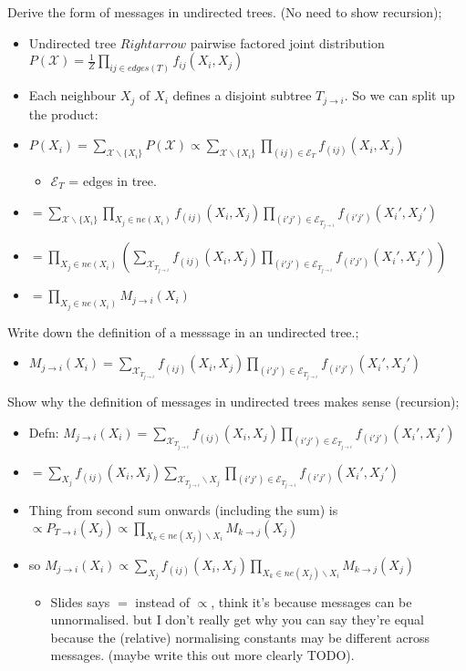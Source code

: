 \documentclass{article}
\begin{document}
Derive the form of messages in undirected trees. (No need to show recursion); \begin{itemize}
    \item Undirected tree $Rightarrow$ pairwise factored joint distribution $P(\mathcal{X})= \frac{1}{Z}\prod_{ij \in edges(T)}f_{ij}(X_i, X_j)$
    \item Each neighbour $X_j$ of $X_i$ defines a disjoint subtree $T_{j\rightarrow i}$. So we can split up the product:
    \item $P(X_i) = \sum_{\mathcal{X}\backslash\{X_i\}} P(\mathcal{X}) \propto \sum_{\mathcal{X}\backslash\{X_i\}}\prod_{(ij)\in \mathcal{E}_T} f_{(ij)}(X_i, X_j)$
    \begin{itemize}
        \item $\mathcal{E}_T$ = edges in tree.
    \end{itemize}
    \item $= \sum_{\mathcal{X}\backslash\{X_i\}}\prod_{X_j\in ne(X_i)}f_{(ij)}(X_i, X_j)\prod_{(i'j')\in \mathcal{E}_T_{j\rightarrow i}} f_{(i'j')}(X_i', X_j')$
    \item $= \prod_{X_j\in ne(X_i)}(\sum_{\mathcal{X}_{T_{j\rightarrow i}}}f_{(ij)}(X_i, X_j)\prod_{(i'j')\in \mathcal{E}_T_{j\rightarrow i}} f_{(i'j')}(X_i', X_j'))$
    \item $= \prod_{X_j\in ne(X_i)}M_{j\rightarrow i}(X_i)$
\end{itemize}

Write down the definition of a messsage in an undirected tree.; \begin{itemize}
    \item  $M_{j\rightarrow i}(X_i) =\sum_{\mathcal{X}_{T_{j\rightarrow i}}}f_{(ij)}(X_i, X_j)\prod_{(i'j')\in \mathcal{E}_T_{j\rightarrow i}} f_{(i'j')}(X_i', X_j')$
\end{itemize}

Show why the definition of messages in undirected trees makes sense (recursion);  \begin{itemize}
    \item Defn: $M_{j\rightarrow i}(X_i) =\sum_{\mathcal{X}_{T_{j\rightarrow i}}}f_{(ij)}(X_i, X_j)\prod_{(i'j')\in \mathcal{E}_T_{j\rightarrow i}} f_{(i'j')}(X_i', X_j')$
    \item $=\sum_{X_j}f_{(ij)}(X_i, X_j)\sum_{\mathcal{X}_{T_{j\rightarrow i}}\backslash X_j}\prod_{(i'j')\in \mathcal{E}_T_{j\rightarrow i}} f_{(i'j')}(X_i', X_j')$
    \item Thing from second sum onwards (including the sum) is $\propto P_{T\rightarrow i}(X_j)\propto \prod_{X_k\in ne(X_j)\backslash X_i} M_{k\rightarrow j}(X_j)$
    \item so $M_{j\rightarrow i}(X_i) \propto \sum_{X_j}f_{(ij)}(X_i, X_j)\prod_{X_k\in ne(X_j)\backslash X_i} M_{k\rightarrow j}(X_j)$
    \begin{itemize}
        \item Slides says $=$ instead of $\propto$, think it's because messages can be unnormalised. but I don't really get why you can say they're equal because the (relative) normalising constants may be different across messages. (maybe write this out more clearly TODO).
    \end{itemize}
\end{itemize}
\end{document}
